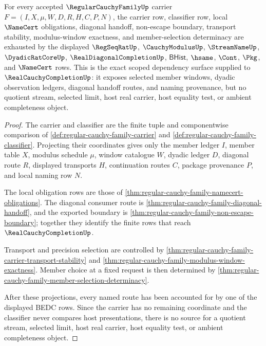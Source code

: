 \begin{theorem}
\label{thm:regular-cauchy-family-scoped-route-package}
For every accepted $\RegularCauchyFamilyUp$ carrier $F=(I,X,\mu,W,D,R,H,C,P,N)$, the carrier row, classifier row, local $\NameCert$ obligations, diagonal handoff, non-escape boundary, transport stability, modulus-window exactness, and member-selection determinacy are exhausted by the displayed $\RegSeqRatUp$, $\CauchyModulusUp$, $\StreamNameUp$, $\DyadicRatCoreUp$, $\RealDiagonalCompletionUp$, $\mathsf{BHist}$, $\hsame$, $\Cont$, $\Pkg$, and $\NameCert$ rows. This is the exact scoped dependency surface supplied to $\RealCauchyCompletionUp$: it exposes selected member windows, dyadic observation ledgers, diagonal handoff routes, and naming provenance, but no quotient stream, selected limit, host real carrier, host equality test, or ambient completeness object.
\end{theorem}
\begin{proof}
The carrier and classifier are the finite tuple and componentwise comparison of \autoref{def:regular-cauchy-family-carrier} and \autoref{def:regular-cauchy-family-classifier}. Projecting their coordinates gives only the member ledger $I$, member table $X$, modulus schedule $\mu$, window catalogue $W$, dyadic ledger $D$, diagonal route $R$, displayed transports $H$, continuation routes $C$, package provenance $P$, and local naming row $N$.

The local obligation rows are those of \autoref{thm:regular-cauchy-family-namecert-obligations}. The diagonal consumer route is \autoref{thm:regular-cauchy-family-diagonal-handoff}, and the exported boundary is \autoref{thm:regular-cauchy-family-non-escape-boundary}; together they identify the finite rows that reach $\RealCauchyCompletionUp$.

Transport and precision selection are controlled by \autoref{thm:regular-cauchy-family-carrier-transport-stability} and \autoref{thm:regular-cauchy-family-modulus-window-exactness}. Member choice at a fixed request is then determined by \autoref{thm:regular-cauchy-family-member-selection-determinacy}.

After these projections, every named route has been accounted for by one of the displayed BEDC rows. Since the carrier has no remaining coordinate and the classifier never compares host presentations, there is no source for a quotient stream, selected limit, host real carrier, host equality test, or ambient completeness object.
\end{proof}

